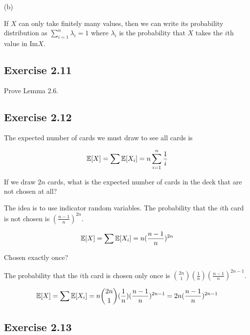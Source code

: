 (b)

If $X$ can only take finitely many values, then we can write its probability distribution as $\sum_{i=1}^{n}\lambda_i = 1$
where $\lambda_i$ is the probability that $X$ takes the $i$th value in Im$X$.

\subsection*{Exercise 2.11}

Prove Lemma 2.6.

\subsection*{Exercise 2.12}

The expected number of cards we must draw to see all cards is

\begin{equation*}
\begin{split}
\mathbb{E}[X] = \sum \mathbb{E}[X_i] = n \sum_{i=1}^{n} \frac{1}{i}
\end{split}
\end{equation*}

If we draw $2n$ cards, what is the expected number of cards in the deck that are not chosen at all?

The idea is to use indicator random variables. 
The probability that the $i$th card is not chosen is $(\frac{n-1}{n})^{2n}$. 

\begin{equation*}
\begin{split}
\mathbb{E}[X] = \sum \mathbb{E}[X_i] = n (\frac{n-1}{n})^{2n}
\end{split}
\end{equation*}

Chosen exactly once?

The probability that the $i$th card is chosen only once is 
$\binom{2n}{1}(\frac{1}{n})(\frac{n-1}{n})^{2n-1}$.

\begin{equation*}
\begin{split}
\mathbb{E}[X] = \sum \mathbb{E}[X_i] = 
n \binom{2n}{1}(\frac{1}{n})(\frac{n-1}{n})^{2n-1}
= 2n (\frac{n-1}{n})^{2n-1}
\end{split}
\end{equation*}

\subsection*{Exercise 2.13}


